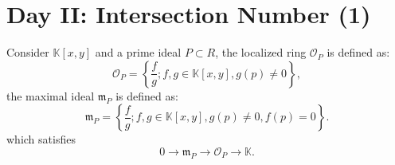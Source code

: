 \documentclass[10pt]{article}
\begin{document}
\section{Day II: Intersection Number (1)}

\begin{definition}
  Consider $ \mathbb{K}[x,y]$ and a prime ideal $ P \subset R$, the localized ring $ \mathcal{O}_P$ is defined as:
  \begin{equation*}
    \mathcal{O}_P = \left\{ \frac{f}{g} ; f, g \in \mathbb{K}[x,y] , g(p) \neq 0 \right\},
  \end{equation*}
  the maximal ideal $ \mathfrak{m}_P$ is defined as:
  \begin{equation*}
    \mathfrak{m}_P = \left\{ \frac{f}{g} ; f,g \in \mathbb{K}[x,y] , g(p) \neq 0 , f(p) = 0\right\}.
  \end{equation*}
  which satisfies
  \begin{equation*}
    0 \rightarrow \mathfrak{m}_P \rightarrow \mathcal{O}_P \rightarrow \mathbb{K}.
  \end{equation*}
\end{definition}

\label{LastPage}
\end{document}

